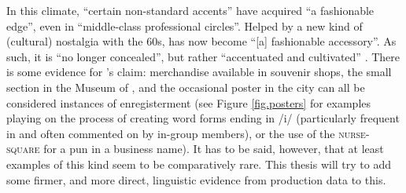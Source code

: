 In this climate, ``certain non-standard accents'' have acquired ``a fashionable edge'', even in ``middle-class professional circles''.
Helped by a new kind of (cultural) nostalgia with the 60s,  has now become ``[a] fashionable accessory''.
As such, it is ``no longer concealed'', but rather ``accentuated and cultivated'' \citep[58]{belchem2006d}.
There is some evidence for \citeauthor{belchem2006d}'s claim: merchandise available in souvenir shops, the small  section in the Museum of , and the occasional poster in the city can all be considered instances of enregisterment (see Figure \ref{fig.posters} for examples playing on the process of creating word forms ending in /i/ (particularly frequent in  and often commented on by in-group members), or the use of the \textsc{nurse}-\textsc{square}  for a pun in a business name).
It has to be said, however, that  at least examples of this kind seem to be comparatively rare.
This thesis will try to add some firmer, and more direct, linguistic evidence from production data to this.

